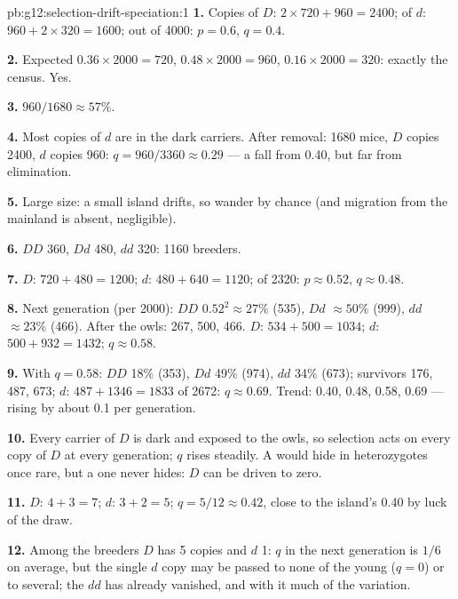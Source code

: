 \begin{solution}{pb:g12:selection-drift-speciation:1}
\textbf{1.} Copies of $D$: $2 \times 720 + 960 = 2400$; of $d$: $960 +
2 \times 320 = 1600$; out of 4000: $p = 0.6$, $q = 0.4$.

\textbf{2.} Expected $0.36 \times 2000 = 720$, $0.48 \times 2000 =
960$, $0.16 \times 2000 = 320$: exactly the census. Yes.

\textbf{3.} $960/1680 \approx 57\%$.

\textbf{4.} Most copies of $d$ are in the dark carriers. After removal:
1680 mice, $D$ copies 2400, $d$ copies 960: $q = 960/3360 \approx
0.29$ --- a fall from 0.40, but far from elimination.

\textbf{5.} Large size: a small island  drifts, so
 wander by chance (and migration from the mainland is
absent,  negligible).

\textbf{6.} $DD$ 360, $Dd$ 480, $dd$ 320: 1160 breeders.

\textbf{7.} $D$: $720 + 480 = 1200$; $d$: $480 + 640 = 1120$; of 2320:
$p \approx 0.52$, $q \approx 0.48$.

\textbf{8.} Next generation (per 2000): $DD$ $0.52^2 \approx 27\%$
(535), $Dd$ $\approx 50\%$ (999), $dd$ $\approx 23\%$ (466). After
the owls: 267, 500, 466. $D$: $534 + 500 = 1034$; $d$: $500 + 932 =
1432$; $q \approx 0.58$.

\textbf{9.} With $q = 0.58$: $DD$ 18\% (353), $Dd$ 49\% (974), $dd$
34\% (673); survivors 176, 487, 673; $d$: $487 + 1346 = 1833$ of 2672:
$q \approx 0.69$. Trend: 0.40, 0.48, 0.58, 0.69 --- rising by about
0.1 per generation.

\textbf{10.} Every carrier of $D$ is dark and exposed to the owls, so
selection acts on every copy of $D$ at every generation; $q$ rises
steadily. A   would hide in heterozygotes once rare,
but a  one never hides: $D$ can be driven to zero.

\textbf{11.} $D$: $4 + 3 = 7$; $d$: $3 + 2 = 5$; $q = 5/12 \approx
0.42$, close to the island's 0.40 by luck of the draw.

\textbf{12.} Among the breeders $D$ has 5 copies and $d$ 1: $q$ in the
next generation is $1/6$ on average, but the single $d$ copy may be
passed to none of the young ($q = 0$) or to several; the $dd$
 has already vanished, and with it much of the variation.


\end{solution}

